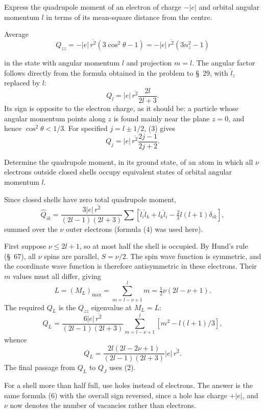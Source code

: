  Express the quadrupole moment of an electron of charge $-|e|$ and orbital angular momentum $l$ in terms of its mean-square distance from the centre.

\SolutionHeading Average
\[Q_{zz}=-|e|\,\overline{r^2}(3\cos^2\theta-1)=-|e|\,\overline{r^2}(3n_z^2-1)\]

in the state with angular momentum $l$ and projection $m=l$. The angular factor follows directly from the formula obtained in the problem to \S~29, with $\widehat l_z$ replaced by $l$:
\begin{equation}Q_l=|e|\,\overline{r^2}\frac{2l}{2l+3}.\tag{1}\end{equation}
Its sign is opposite to the electron charge, as it should be: a particle whose angular momentum points along $z$ is found mainly near the plane $z=0$, and hence $\cos^2\theta<1/3$. For specified $j=l\pm1/2$, (3) gives
\begin{equation}Q_j=|e|\,\overline{r^2}\frac{2j-1}{2j+2}.\tag{2}\end{equation}

 Determine the quadrupole moment, in its ground state, of an atom in which all $\nu$ electrons outside closed shells occupy equivalent states of orbital angular momentum $l$.

\SolutionHeading Since closed shells have zero total quadrupole moment,
\[\widehat Q_{ik}=\frac{3|e|\,\overline{r^2}}{(2l-1)(2l+3)}\sum[\widehat l_i\widehat l_k+\widehat l_k\widehat l_i-\tfrac23l(l+1)\delta_{ik}],\]
summed over the $\nu$ outer electrons (formula (4) was used here).

First suppose $\nu\leqslant2l+1$, so at most half the shell is occupied. By Hund's rule (\S~67), all $\nu$ spins are parallel, $S=\nu/2$. The spin wave function is symmetric, and the coordinate wave function is therefore antisymmetric in these electrons. Their $m$ values must all differ, giving
\[L=(M_L)_{\max}=\sum_{m=l-\nu+1}^{l}m=\tfrac12\nu(2l-\nu+1).\]
The required $Q_L$ is the $Q_{zz}$ eigenvalue at $M_L=L$:
\[Q_L=\frac{6|e|\,\overline{r^2}}{(2l-1)(2l+3)}\sum_{m=l-\nu+1}^{l}[m^2-l(l+1)/3],\]
whence
\begin{equation}Q_L=\frac{2l(2l-2\nu+1)}{(2l-1)(2l+3)}|e|\,\overline{r^2}.\tag{1}\end{equation}
The final passage from $Q_L$ to $Q_J$ uses (2).

For a shell more than half full, use holes instead of electrons. The answer is the same formula (6) with the overall sign reversed, since a hole has charge $+|e|$, and $\nu$ now denotes the number of vacancies rather than electrons.
